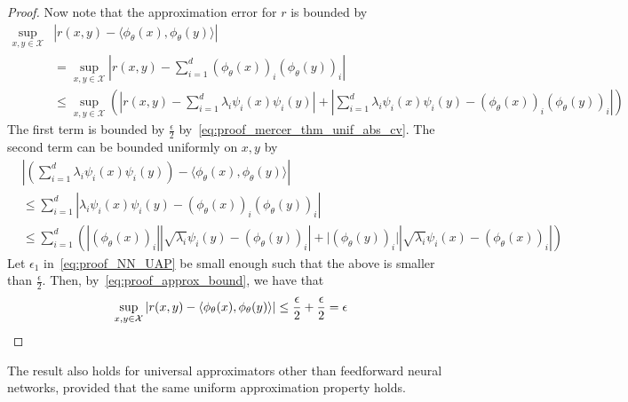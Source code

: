 \begin{proof}
	Now note that the approximation error for \(r\) is bounded by
	\begin{equation}
		\label{eq:proof_approx_bound}
		\begin{split}
			\sup_{x, y \in \mathcal{X}}&{
				\left\lvert r(x,y) - \langle \phi_\theta(x), \phi_\theta(y) \rangle \right\rvert}\\
			&= \sup_{x, y \in \mathcal{X}}{
				\left\lvert r(x,y) - \sum_{i=1}^{d}{(\phi_\theta(x))_i (\phi_\theta(y))_i} \right\rvert} \\
			&\leq \sup_{x,y \in \mathcal{X}}{ \left(
				\left\lvert r(x,y) - \sum_{i=1}^{d}{\lambda_i \psi_i(x) \psi_i(y)} \right\rvert
				+ \left\lvert \sum_{i=1}^{d}{\lambda_i \psi_i(x) \psi_i(y) - (\phi_\theta(x))_i (\phi_\theta(y))_i} \right\rvert  \right) }
		\end{split}
	\end{equation}
	The first term is bounded by \(\frac{\epsilon}{2}\) by~\eqref{eq:proof_mercer_thm_unif_abs_cv}. The second term can be bounded uniformly on \(x,y\) by
	\begin{equation*}
		\begin{split}
			&\left\lvert \left(\sum_{i=1}^{d}{\lambda_i \psi_i(x) \psi_i(y)}\right) - \langle \phi_\theta(x), \phi_\theta(y) \rangle \right\rvert  \\
			&\leq \sum_{i=1}^{d}{ \left\lvert \lambda_i \psi_i(x) \psi_i(y) - (\phi_\theta(x))_i (\phi_\theta(y))_i \right\rvert} \\
			&\leq \sum_{i=1}^{d}{\left(
				\left\lvert (\phi_\theta(x))_i \right\rvert \left\lvert \sqrt{\lambda_i} \psi_i(y) - (\phi_\theta(y))_i \right\rvert
				+ \lvert (\phi_\theta(y))_i \rvert \left\lvert \sqrt{\lambda_i} \psi_i(x) - (\phi_\theta(x))_i \right\rvert
				\right)}
		\end{split}
	\end{equation*}
	Let \(\epsilon_1\) in~\eqref{eq:proof_NN_UAP} be small enough such that the above is smaller than \(\frac{\epsilon}{2}\). Then, by~\eqref{eq:proof_approx_bound}, we have that
	\begin{equation*}
		\sup_{x, y \in \mathcal{X}}{
			\left\lvert r(x,y) - \left \langle \phi_\theta(x), \phi_\theta(y) \right\rangle\right\rvert} \leq \frac{\epsilon}{2} + \frac{\epsilon}{2} = \epsilon
	\end{equation*}
\end{proof}

\begin{remark}
	The result also holds for universal approximators other than feedforward neural networks, provided that the same uniform approximation property holds.
\end{remark}